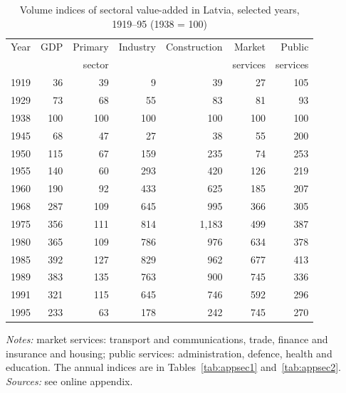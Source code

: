 \begin{table}[htbp]
\centering\footnotesize
\caption{Volume indices of sectoral value-added in Latvia, selected years, 1919--95 (1938 = 100)}
\label{tab:sectoralidx}
\begin{threeparttable}
\begin{tabular}{lrrrrrr}
\toprule
Year & GDP & Primary & Industry & Construction & Market & Public \\
& & sector & & & services & services \\
\midrule
1919 & 36 & 39 & 9 & 39 & 27 & 105 \\
1929 & 73 & 68 & 55 & 83 & 81 & 93 \\
1938 & 100 & 100 & 100 & 100 & 100 & 100 \\
\midrule
1945 & 68 & 47 & 27 & 38 & 55 & 200 \\
1950 & 115 & 67 & 159 & 235 & 74 & 253 \\
1955 & 140 & 60 & 293 & 420 & 126 & 219 \\
1960 & 190 & 92 & 433 & 625 & 185 & 207 \\
1968 & 287 & 109 & 645 & 995 & 366 & 305 \\
1975 & 356 & 111 & 814 & 1,183 & 499 & 387 \\
1980 & 365 & 109 & 786 & 976 & 634 & 378 \\
1985 & 392 & 127 & 829 & 962 & 677 & 413 \\
1989 & 383 & 135 & 763 & 900 & 745 & 336 \\
\midrule
1991 & 321 & 115 & 645 & 746 & 592 & 296 \\
1995 & 233 & 63 & 178 & 242 & 745 & 270 \\
\bottomrule
\end{tabular}
\begin{tablenotes}
\footnotesize
\textit{Notes:} market services: transport and communications, trade, finance and insurance and housing; public services: administration, defence, health and education. The annual indices are in Tables~\ref{tab:appsec1} and~\ref{tab:appsec2}. \textit{Sources:} see online appendix.
\end{tablenotes}
\end{threeparttable}
\end{table}
